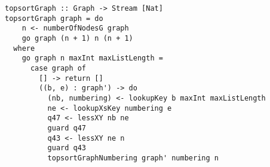 \begin{figure*}[!t]
  \centering
  \begin{minipage}{\textwidth}
    \begin{lstlisting}[label={topsort_graph}, caption={Functional implementation for a \lstinline{topsortoTrue in out} direction}, captionpos=b, frame=tb]
topsortGraph :: Graph -> Stream [Nat]
topsortGraph graph = do
    n <- numberOfNodesG graph
    go graph (n + 1) n (n + 1)
  where
    go graph n maxInt maxListLength =
      case graph of
        [] -> return []
        ((b, e) : graph') -> do
          (nb, numbering) <- lookupKey b maxInt maxListLength
          ne <- lookupXsKey numbering e
          q47 <- lessXY nb ne
          guard q47
          q43 <- lessXY ne n
          guard q43
          topsortGraphNumbering graph' numbering n
    \end{lstlisting}
  \end{minipage}
\end{figure*}